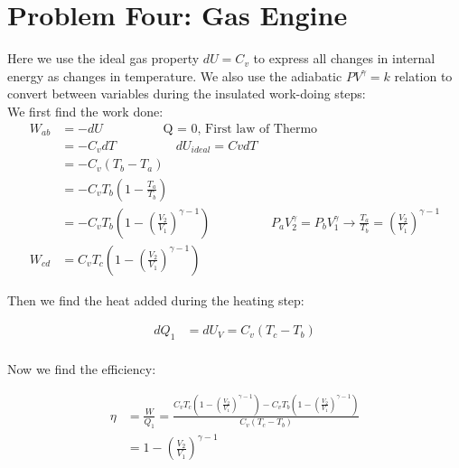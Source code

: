 \documentclass[10pt]{article} %
\begin{document}
\section{Problem Four: Gas Engine}
Here we use the ideal gas property $dU = C_v$ to express all changes in internal energy
as changes in temperature. We also use the adiabatic $PV^\gamma = k$ relation to convert
between variables during the insulated work-doing steps:\\

We first find the work done:
\begin{align*}
  W_{ab} &= -dU \hspace{2cm}\mbox{Q = 0, First law of Thermo}\\
  &= -C_vdT \hspace{2cm}dU_{ideal} = CvdT\\
  &= -C_v\left(T_b-T_a\right)\\
  &= -C_vT_b\left(1-\frac{T_a}{T_b}\right)\\
  &= -C_vT_b\left(1-\left(\frac{V_2}{V_1}\right)^{\gamma-1}\right)
             \hspace{2cm}P_aV_2^\gamma = P_bV_1^\gamma \rightarrow
             \frac{T_a}{T_b} = \left(\frac{V_2}{V_1}\right)^{\gamma-1}\\
  W_{cd} &= C_vT_c\left(1 - \left(\frac{V_2}{V_1}\right)^{\gamma-1}\right)
\end{align*}

Then we find the heat added during the heating step:

\begin{align*}
  dQ_1 &= dU_V = C_v\left(T_c-T_b\right)\\
\end{align*}

Now we find the efficiency:

\begin{align*}
  \eta &= \frac{W}{Q_1} = \frac{C_vT_c\left(1 - \left(\frac{V_2}{V_1}\right)^{\gamma-1}\right)
    - C_vT_b\left(1-\left(\frac{V_2}{V_1}\right)^{\gamma-1}\right)}{C_v\left(T_c-T_b\right)}\\
  &= 1 - \left(\frac{V_2}{V_1}\right)^{\gamma-1}\\
\end{align*}
\end{document}
